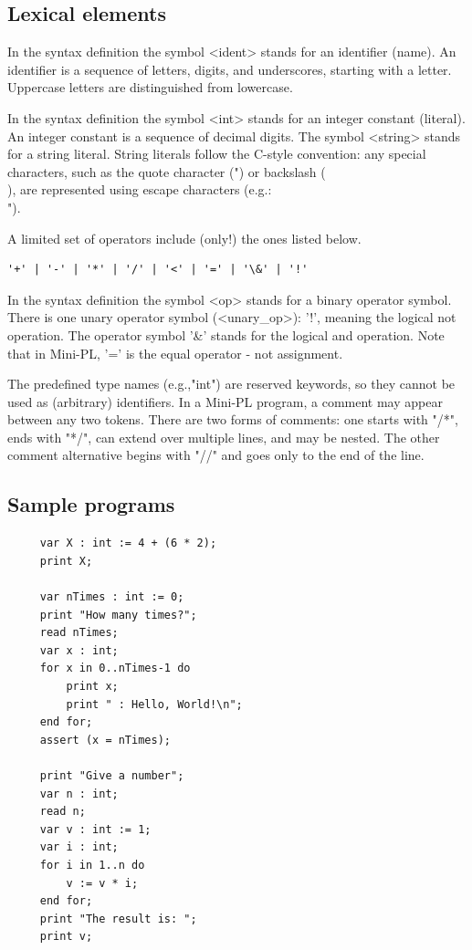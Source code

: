\documentclass{article}
\begin{document}
\subsection{Lexical elements}

In the syntax definition the symbol <ident> stands for an identifier (name). An
identifier is a sequence of letters, digits, and underscores, starting with a
letter. Uppercase letters are distinguished from lowercase.

In the syntax definition the symbol <int> stands for an integer constant
(literal). An integer constant is a sequence of decimal digits. The symbol
<string> stands for a string literal. String literals follow the C-style
convention: any special characters, such as the quote character (") or
backslash (\\), are represented using escape characters (e.g.: \\").

A limited set of operators include (only!) the ones listed below.

\begin{verbatim}
'+' | '-' | '*' | '/' | '<' | '=' | '\&' | '!'
\end{verbatim}

In the syntax definition the symbol <op> stands for a binary operator symbol.
There is one unary operator symbol (<unary\_op>): '!', meaning the logical not
operation. The operator symbol '\&' stands for the logical and operation. Note
that in Mini-PL, '=' is the equal operator - not assignment.

The predefined type names (e.g.,"int") are reserved keywords, so they cannot be
used as (arbitrary) identifiers. In a Mini-PL program, a comment may appear
between any two tokens. There are two forms of comments: one starts with "/*",
ends with "*/", can extend over multiple lines, and may be nested. The other
comment alternative begins with "//" and goes only to the end of the line.

\subsection{Sample programs}
\begin{verbatim}
     var X : int := 4 + (6 * 2);
     print X;

     var nTimes : int := 0;
     print "How many times?";
     read nTimes;
     var x : int;
     for x in 0..nTimes-1 do
         print x;
         print " : Hello, World!\n";
     end for;
     assert (x = nTimes);

     print "Give a number";
     var n : int;
     read n;
     var v : int := 1;
     var i : int;
     for i in 1..n do
         v := v * i;
     end for;
     print "The result is: ";
     print v;
\end{verbatim}
\end{document}
